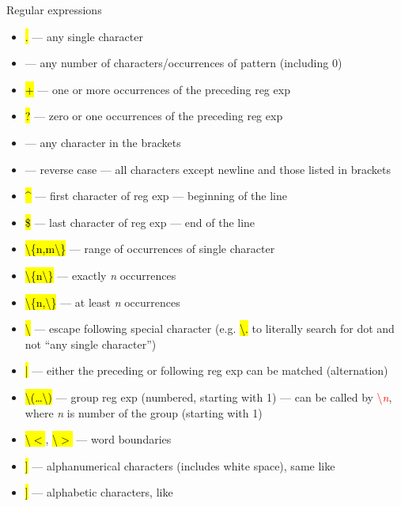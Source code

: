 \documentclass[compress, ucs, xelatex, 11pt, xcolor=svgnames,
  hyperref={
    bookmarks=true,
    unicode=true,
    colorlinks=true,
    pdftitle={Linux, command line and MetaCentrum},
    plainpages=false,
    pdfauthor={Vojtech Zeisek},
    pdfsubject={Course about use of Linux command line, writing shell scripts and using MetaCentrum of CESNET},
    pdfcreator={XeLaTeX},
    pdfkeywords={Linux, GNU, BASH, shell, command line, MetaCentrum},
    linkcolor=DarkRed,
    anchorcolor=DarkBlue,
    citecolor=Indigo,
    filecolor=NavyBlue,
    menucolor=DarkMagenta,
    urlcolor=DarkBlue,
    pdftex},
  url={hyphens, lowtilde} %
  ]{beamer}
\renewcommand{\texttt}[1]{\hl{\ttfamily #1}}
\renewcommand{\alert}[1]{\textcolor{red}{#1}}
\begin{document}
\begin{frame}[allowframebreaks]{Regular expressions}
  \label{regexp}
  \begin{itemize}
    \item \alert{\texttt{.}} --- any single character
    \item \alert{\texttt{*}} --- any number of characters/occurrences of pattern (including 0)
    \item \alert{\texttt{+}} --- one or more occurrences of the preceding reg exp
    \item \alert{\texttt{?}} --- zero or one occurrences of the preceding reg exp
    \item \alert{\texttt{[\ldots]}} --- any character in the brackets
    \item \alert{\texttt{[\textasciicircum\ldots]}} --- reverse case --- all characters except newline and those listed in brackets
    \item \alert{\texttt{\textasciicircum}} --- first character of reg exp --- beginning of the line
    \item \alert{\texttt{\$}} --- last character of reg exp --- end of the line
    \item \alert{\texttt{\textbackslash\{n,m\textbackslash\}}} --- range of occurrences of single character
    \item \alert{\texttt{\textbackslash\{n\textbackslash\}}} --- exactly \textit{n} occurrences
    \item \alert{\texttt{\textbackslash\{n,\textbackslash\}}} --- at least \textit{n} occurrences
    \item \alert{\texttt{\textbackslash}} --- escape following special character (e.g. \texttt{\textbackslash .} to literally search for dot and not ``any single character'')
    \item \alert{\texttt{|}} --- either the preceding or following reg exp can be matched (alternation)
    \item \alert{\texttt{\textbackslash(\ldots\textbackslash)}} --- group reg exp (numbered, starting with 1) --- can be called by \alert{\textbackslash\textit{n}}, where \textit{n} is number of the group (starting with 1)
    \item \alert{\texttt{\textbackslash$<$}}, \alert{\texttt{\textbackslash$>$}} --- word boundaries
    \item \alert{\texttt{[[:alnum:]]}} --- alphanumerical characters (includes white space), same like \alert{\texttt{[a-zA-Z0-9]}}
    \item \alert{\texttt{[[:alpha:]]}} --- alphabetic characters, like \alert{\texttt{[a-zA-Z]}}

\end{itemize}
\end{frame}
\end{document}
